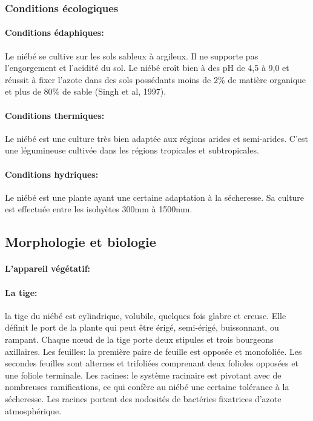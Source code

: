 \documentclass[a4paper,11pt]{article}
\begin{document}
\subsubsection{Conditions écologiques}

\paragraph{Conditions édaphiques:}

Le niébé se cultive sur les sols sableux à argileux. Il ne supporte
pas l’engorgement et l’acidité du sol. Le niébé croît bien à des pH de
4,5 à 9,0 et réussit à fixer l’azote dans des sols possédants moins de
2\% de matière organique et plus de 80\% de sable (Singh et al,
1997)\cite{Doggett_1988}.

\paragraph{Conditions thermiques:}

Le niébé est une culture très bien adaptée aux régions arides et
semi-arides. C’est une légumineuse cultivée dans les régions
tropicales et subtropicales\cite{Doggett_1988}.

\paragraph{Conditions hydriques:}

Le niébé est une plante ayant une certaine adaptation à la
sécheresse. Sa culture est effectuée entre les isohyètes 300mm à
1500mm\cite{Doggett_1988}.

\subsection{Morphologie et biologie}

  
\paragraph{L’appareil végétatif:}

\paragraph{La tige:} la tige du niébé est cylindrique, volubile, quelques fois
glabre et creuse. Elle définit le port de la plante qui peut être
érigé, semi-érigé, buissonnant, ou rampant. Chaque nœud de la tige
porte deux stipules et trois bourgeons axillaires.  Les feuilles: la
première paire de feuille est opposée et monofoliée. Les secondes
feuilles sont alternes et trifoliées comprenant deux folioles opposées
et une foliole terminale.  Les racines: le système racinaire est
pivotant avec de nombreuses ramifications, ce qui confère au niébé une
certaine tolérance à la sécheresse. Les racines portent des nodosités
de bactéries fixatrices d’azote atmosphérique.
\end{document}
